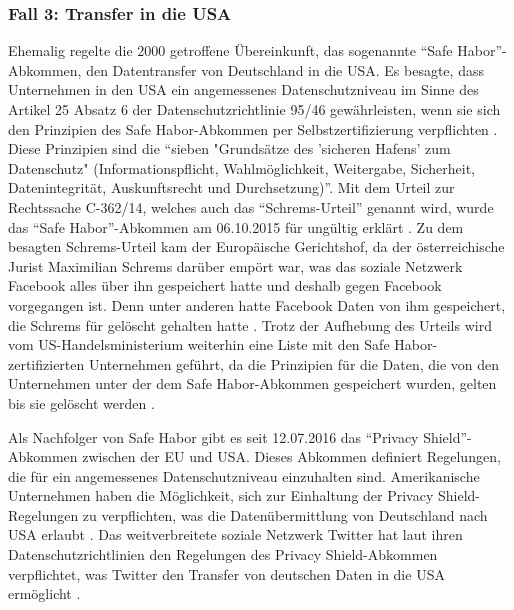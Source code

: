 \subsubsection{Fall 3: Transfer in die USA}
Ehemalig regelte die 2000 getroffene Übereinkunft, das sogenannte "`Safe Habor"'-Abkommen, den Datentransfer von Deutschland in die USA. Es besagte, dass Unternehmen in den USA ein angemessenes Datenschutzniveau im Sinne des Artikel 25 Absatz 6 der Datenschutzrichtlinie 95/46 gewährleisten, wenn sie sich den Prinzipien des Safe Habor-Abkommen per Selbstzertifizierung verpflichten \autocite[vgl.][]{BDFI.2017}. Diese Prinzipien sind die "`sieben "Grundsätze des  'sicheren Hafens' zum Datenschutz" (Informationspflicht, Wahlmöglichkeit, Weitergabe, Sicherheit, Datenintegrität, Auskunftsrecht und Durchsetzung)"'. \autocite[][]{BDFI.2017} Mit dem Urteil zur Rechtssache C-362/14, welches auch das "`Schrems-Urteil"' genannt wird, wurde das "`Safe Habor"'-Abkommen am 06.10.2015 für ungültig erklärt \autocite[vgl.][]{BDFI.2017}. Zu dem besagten Schrems-Urteil kam der Europäische Gerichtshof, da der österreichische Jurist Maximilian Schrems darüber empört war, was das soziale Netzwerk Facebook alles über ihn gespeichert hatte und deshalb gegen Facebook vorgegangen ist. Denn unter anderen hatte Facebook Daten von ihm gespeichert, die Schrems für gelöscht gehalten hatte \autocite[vgl.][]{Welt.2015}. Trotz der Aufhebung des Urteils wird vom US-Handelsministerium weiterhin eine Liste mit den Safe Habor-zertifizierten Unternehmen geführt, da die Prinzipien für die Daten, die von den Unternehmen unter der dem Safe Habor-Abkommen gespeichert wurden, gelten bis sie gelöscht werden \autocite[vgl.][]{BDFI.2017}.
\par
Als Nachfolger von Safe Habor gibt es seit 12.07.2016 das "`Privacy Shield"'-Abkommen zwischen der \ac{EU} und USA. Dieses Abkommen definiert Regelungen, die für ein angemessenes Datenschutzniveau einzuhalten sind. Amerikanische Unternehmen haben die Möglichkeit, sich zur Einhaltung der Privacy Shield-Regelungen zu verpflichten, was die Datenübermittlung von Deutschland nach USA erlaubt \autocite[vgl.][]{LDI.2017}. Das weitverbreitete soziale Netzwerk Twitter hat laut ihren Datenschutzrichtlinien den Regelungen des Privacy Shield-Abkommen verpflichtet, was Twitter den Transfer von deutschen Daten in die USA ermöglicht \autocite[vgl.][]{TwitterInc..2017}.

